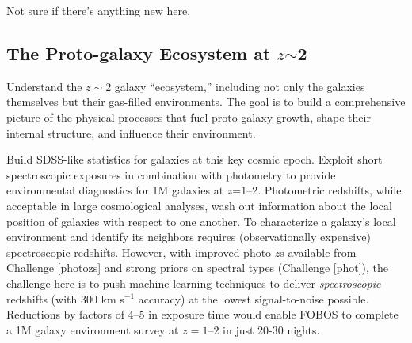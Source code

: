 Not sure if there's anything new here.

\noindent{}

\noindent{}

\subsection{The Proto-galaxy Ecosystem at $z$$\sim$2}
\label{sec:galaxies}

%
%
%
%


Understand the $z \sim 2$ galaxy ``ecosystem,'' including not only
the galaxies themselves but their gas-filled environments. The goal
is to build a comprehensive picture of the physical processes that
fuel proto-galaxy growth, shape their internal structure, and
influence their environment.

\noindent{} Build SDSS-like statistics for galaxies at
this key cosmic epoch. Exploit short spectroscopic exposures in
combination with photometry to provide environmental diagnostics for
1M galaxies at $z$=1--2. Photometric redshifts, while acceptable in
large cosmological analyses, wash out information about the local
position of galaxies with respect to one another. To characterize a
galaxy's local environment and identify its neighbors requires
(observationally expensive) spectroscopic redshifts. However, with
improved photo-$z$s available from Challenge \ref{photozs} and strong
priors on spectral types (Challenge \ref{phot}), the challenge here
is to push machine-learning techniques to deliver
\emph{spectroscopic} redshifts (with 300 km s$^{-1}$ accuracy) at the
lowest signal-to-noise possible. Reductions by factors of 4--5 in
exposure time would enable FOBOS to complete a 1M galaxy environment
survey at $z=1$--$2$ in just 20-30 nights.

\noindent{}

\noindent{}

\noindent{}

